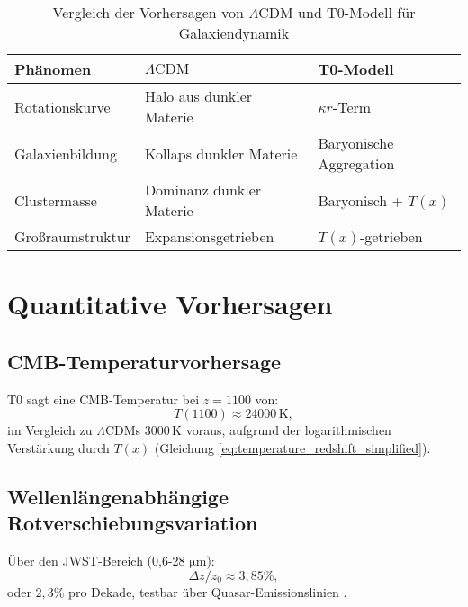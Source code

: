 \documentclass[twocolumn,aps,prl]{revtex4-2}
\newcommand{\Tfield}{T(x)}
\newcommand{\LCDM}{\Lambda\text{CDM}}
\begin{document}
	\begin{table}[ht]
		\centering
		\caption{Vergleich der Vorhersagen von \(\LCDM\) und T0-Modell für Galaxiendynamik}
		\label{tab:galaxy_dynamics_comparison}
		\small
		\begin{tabular}{p{} p{} p{}}
			\hline
			\textbf{Phänomen} & \textbf{\(\LCDM\)} & \textbf{T0-Modell} \\
			\hline
			Rotationskurve & Halo aus dunkler Materie & \(\kappa r\)-Term \\
			Galaxienbildung & Kollaps dunkler Materie & Baryonische Aggregation \\
			Clustermasse & Dominanz dunkler Materie & Baryonisch + \(\Tfield\) \\
			Großraumstruktur & Expansionsgetrieben & \(\Tfield\)-getrieben \\
			\hline
		\end{tabular}
	\end{table}
	
	\section{Quantitative Vorhersagen}
	\label{sec:predictions}
	
	\subsection{CMB-Temperaturvorhersage}
	\label{subsec:cmb_temp_prediction}
	
	T0 sagt eine CMB-Temperatur bei \(z = 1100\) von:
	\begin{equation}
		T(1100) \approx 24000 \, \text{K},
		\label{eq:cmb_temp_t0}
	\end{equation}
	im Vergleich zu \(\LCDM\)s \(3000 \, \text{K}\) voraus, aufgrund der logarithmischen Verstärkung durch \(\Tfield\) (Gleichung \ref{eq:temperature_redshift_simplified}).
	
	\subsection{Wellenlängenabhängige Rotverschiebungsvariation}
	\label{subsec:wavelength_redshift_prediction}
	
	Über den JWST-Bereich (0,6-28 \(\si{\micro\meter}\)):
	\begin{equation}
		\Delta z / z_0 \approx 3,85\%,
		\label{eq:wavelength_variation}
	\end{equation}
	oder \(2,3\%\) pro Dekade, testbar über Quasar-Emissionslinien \cite{pascher_params_2025}.
	
\end{document}
